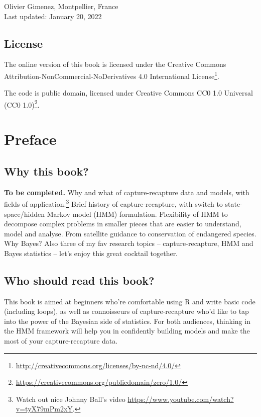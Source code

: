 \documentclass[
  12pt,
]{krantz}
\renewcommand{\href}[2]{#2\footnote{\url{#1}}}
\begin{document}
Olivier Gimenez, Montpellier, France\\
Last updated: January 20, 2022

\hypertarget{license}{%
\section*{License}\label{license}}


The online version of this book is licensed under the \href{http://creativecommons.org/licenses/by-nc-nd/4.0/}{Creative Commons Attribution-NonCommercial-NoDerivatives 4.0 International License}.

The code is public domain, licensed under \href{https://creativecommons.org/publicdomain/zero/1.0/}{Creative Commons CC0 1.0 Universal (CC0 1.0)}.

\hypertarget{preface}{%
\chapter*{Preface}\label{preface}}


\hypertarget{why-this-book}{%
\section*{Why this book?}\label{why-this-book}}


\textbf{To be completed.} Why and what of capture-recapture data and models, with fields of application.\footnote{Watch out nice Johnny Ball's video \url{https://www.youtube.com/watch?v=tyX79mPm2xY}.} Brief history of capture-recapture, with switch to state-space/hidden Markov model (HMM) formulation. Flexibility of HMM to decompose complex problems in smaller pieces that are easier to understand, model and analyse. From satellite guidance to conservation of endangered species. Why Bayes? Also three of my fav research topics -- capture-recapture, HMM and Bayes statistics -- let's enjoy this great cocktail together.

\hypertarget{who-should-read-this-book}{%
\section*{Who should read this book?}\label{who-should-read-this-book}}


This book is aimed at beginners who're comfortable using R and write basic code (including loops), as well as connoisseurs of capture-recapture who'd like to tap into the power of the Bayesian side of statistics. For both audiences, thinking in the HMM framework will help you in confidently building models and make the most of your capture-recapture data.
\end{document}
